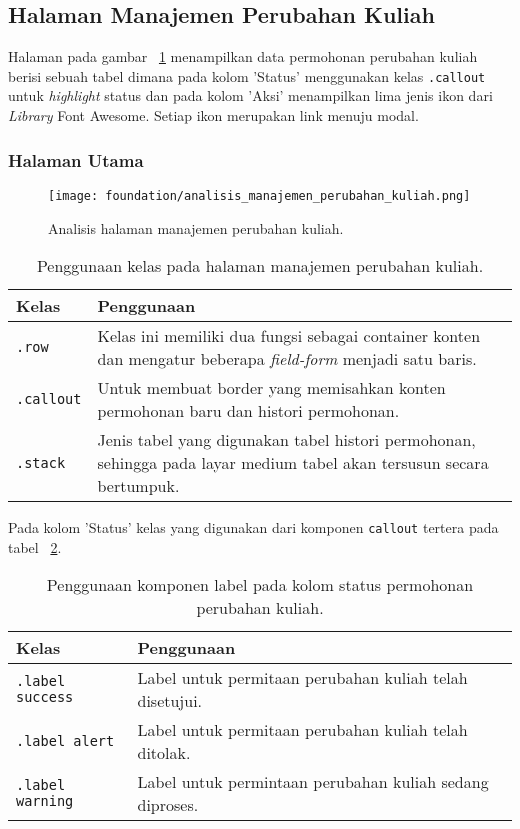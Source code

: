 \subsection{Halaman Manajemen Perubahan Kuliah}
Halaman pada gambar ~\ref{fig:analisisManajemenPerubahanKuliah} menampilkan data permohonan perubahan kuliah berisi sebuah tabel dimana pada kolom 'Status' menggunakan kelas \texttt{.callout} untuk \textit{highlight} status dan pada kolom 'Aksi' menampilkan lima jenis ikon dari \textit{Library} Font Awesome. Setiap ikon merupakan link menuju modal.
\subsubsection{Halaman Utama}
\begin{figure} [H]
	\centering  
	\texttt{[image: foundation/analisis\_manajemen\_perubahan\_kuliah.png]}
	\caption{Analisis halaman manajemen perubahan kuliah.}
	\label{fig:analisisManajemenPerubahanKuliah}
\end{figure}

\begin{table}[H]
	\centering
	\caption{Penggunaan kelas pada halaman manajemen perubahan kuliah.}
	\begin{tabularx}{\textwidth}{lX}
		\toprule
		Kelas     & Penggunaan \\
		\midrule
		\texttt{.row} & Kelas ini memiliki dua fungsi sebagai container konten dan mengatur beberapa \textit{field-form} menjadi satu baris.\\ 
		\texttt{.callout} & Untuk membuat border yang memisahkan konten permohonan baru dan histori permohonan.\\
		\texttt{.stack} & Jenis tabel yang digunakan tabel histori permohonan, sehingga pada layar medium tabel akan tersusun secara bertumpuk.\\
		\bottomrule
	\end{tabularx}%
	\label{table:analisisManajemenPerubahanKuliah}
\end{table}

\noindent Pada kolom 'Status' kelas yang digunakan dari komponen \texttt{callout} tertera pada tabel ~\ref{table:analisisLabelManajemenPerubahanKuliah}.
\begin{table}[H]
	\centering
	\caption{Penggunaan komponen label pada kolom status permohonan perubahan kuliah.}
	\begin{tabularx}{\textwidth}{lX}
		\toprule
		Kelas     & Penggunaan \\
		\midrule
		\texttt{.label success} & Label untuk permitaan perubahan kuliah telah disetujui.\\
		\texttt{.label alert} &  Label untuk permitaan perubahan kuliah telah ditolak.\\
		\texttt{.label warning} & Label untuk permintaan perubahan kuliah sedang diproses.\\
		\bottomrule
	\end{tabularx}%
	\label{table:analisisLabelManajemenPerubahanKuliah}
\end{table}\\

